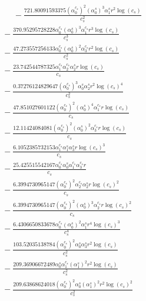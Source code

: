 \documentclass[10pt]{article}
\begin{document}
\begin{align*}
\phantom{R_{3,9}} &\phantom{={}}{}  - \frac{721.80091593375 \left(\alpha_{0}^{c_s}\right)^{2} \left(\alpha_{0}^s\right)^{3} \alpha_{1}^s r^{2} \log{\left(c_{s} \right)}}{c_{s}^{2}} \\
&{}  - \frac{370.95295728228 \alpha_{0}^{c_s} \left(\alpha_{0}^s\right)^{3} \alpha_{1}^{c_s} r^{3} \log{\left(c_{s} \right)}}{c_{s}^{3}} \\
&{}  - \frac{47.273557256133 \alpha_{0}^{c_s} \left(\alpha_{0}^s\right)^{2} \alpha_{3}^{c_s} r^{2} \log{\left(c_{s} \right)}}{c_{s}^{2}} \\
&{}  - \frac{23.742544787325 \alpha_{1}^{c_s} \alpha_{2}^{c_s} \alpha_{2}^s r \log{\left(c_{s} \right)}}{c_{s}} \\
&{}  - \frac{0.37276124829647 \left(\alpha_{0}^{c_s}\right)^{3} \alpha_{0}^s \alpha_{2}^s r^{2} \log{\left(c_{s} \right)}^{4}}{c_{s}^{2}} \\
&{}  - \frac{47.851027601122 \left(\alpha_{0}^{c_s}\right)^{2} \left(\alpha_{0}^s\right)^{4} \alpha_{1}^{c_s} r \log{\left(c_{s} \right)}}{c_{s}} \\
&{}  - \frac{12.11424084081 \left(\alpha_{0}^{c_s}\right)^{2} \left(\alpha_{0}^s\right)^{2} \alpha_{3}^{c_s} r \log{\left(c_{s} \right)}}{c_{s}} \\
&{}  - \frac{6.1052385732153 \alpha_{1}^{c_s} \alpha_{1}^s \alpha_{3}^s r \log{\left(c_{s} \right)}^{3}}{c_{s}} \\
&{}  - \frac{25.425515542167 \alpha_{0}^{c_s} \alpha_{0}^s \alpha_{1}^{c_s} \alpha_{3}^{c_s} r}{c_{s}} \\
&{}  - \frac{6.3994730965147 \left(\alpha_{0}^{c_s}\right)^{2} \alpha_{2}^{c_s} \alpha_{2}^s r \log{\left(c_{s} \right)}^{2}}{c_{s}} \\
&{}  - \frac{6.3994730965147 \left(\alpha_{0}^{c_s}\right)^{2} \left(\alpha_{0}^s\right)^{3} \alpha_{2}^{c_s} r \log{\left(c_{s} \right)}^{2}}{c_{s}} \\
&{}  - \frac{6.4306650833678 \alpha_{0}^{c_s} \left(\alpha_{0}^s\right)^{2} \alpha_{1}^s r^{4} \log{\left(c_{s} \right)}^{3}}{c_{s}^{4}} \\
&{}  - \frac{103.52035138784 \left(\alpha_{0}^{c_s}\right)^{2} \alpha_{0}^s \alpha_{3}^s r^{2} \log{\left(c_{s} \right)}}{c_{s}^{2}} \\
&{}  - \frac{209.36906672489 \alpha_{0}^s \alpha_{1}^{c_s} \left(\alpha_{1}^s\right)^{2} r^{2} \log{\left(c_{s} \right)}}{c_{s}^{2}} \\
&{}  - \frac{209.63868624018 \left(\alpha_{0}^{c_s}\right)^{2} \alpha_{0}^s \left(\alpha_{1}^s\right)^{2} r^{2} \log{\left(c_{s} \right)}^{2}}{c_{s}^{2}} \\

\end{align*}
\end{document}
